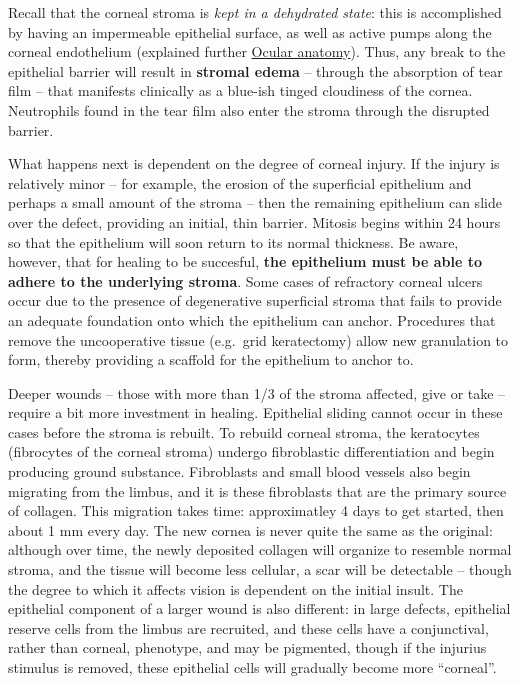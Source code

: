 \documentclass[openany]{book}
\begin{document}
Recall that the corneal stroma is \emph{kept in a dehydrated state}:
this is accomplished by having an impermeable epithelial surface, as
well as active pumps along the corneal endothelium (explained further
\protect\hyperlink{ocular-anatomy}{Ocular anatomy}). Thus, any break to
the epithelial barrier will result in \textbf{stromal edema} -- through
the absorption of tear film -- that manifests clinically as a blue-ish
tinged cloudiness of the cornea. Neutrophils found in the tear film also
enter the stroma through the disrupted barrier.

What happens next is dependent on the degree of corneal injury. If the
injury is relatively minor -- for example, the erosion of the
superficial epithelium and perhaps a small amount of the stroma -- then
the remaining epithelium can slide over the defect, providing an
initial, thin barrier. Mitosis begins within 24 hours so that the
epithelium will soon return to its normal thickness. Be aware, however,
that for healing to be succesful, \textbf{the epithelium must be able to
adhere to the underlying stroma}. Some cases of refractory corneal
ulcers occur due to the presence of degenerative superficial stroma that
fails to provide an adequate foundation onto which the epithelium can
anchor. Procedures that remove the uncooperative tissue (e.g.~grid
keratectomy) allow new granulation to form, thereby providing a scaffold
for the epithelium to anchor to.

Deeper wounds -- those with more than 1/3 of the stroma affected, give
or take -- require a bit more investment in healing. Epithelial sliding
cannot occur in these cases before the stroma is rebuilt. To rebuild
corneal stroma, the keratocytes (fibrocytes of the corneal stroma)
undergo fibroblastic differentiation and begin producing ground
substance. Fibroblasts and small blood vessels also begin migrating from
the limbus, and it is these fibroblasts that are the primary source of
collagen. This migration takes time: approximatley 4 days to get
started, then about 1 mm every day. The new cornea is never quite the
same as the original: although over time, the newly deposited collagen
will organize to resemble normal stroma, and the tissue will become less
cellular, a scar will be detectable -- though the degree to which it
affects vision is dependent on the initial insult. The epithelial
component of a larger wound is also different: in large defects,
epithelial reserve cells from the limbus are recruited, and these cells
have a conjunctival, rather than corneal, phenotype, and may be
pigmented, though if the injurius stimulus is removed, these epithelial
cells will gradually become more ``corneal''.
\end{document}
